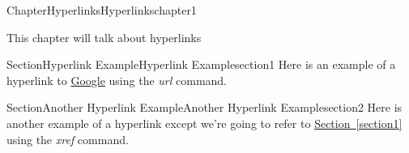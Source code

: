 \documentclass[oneside,10pt,]{book}
\newcommand{\xreffont}{\relax}
\begin{document}
\raggedbottom
%
%
\typeout{************************************************}
\typeout{************************************************}
%
\begin{chapterptx}{Chapter}{Hyperlinks}{}{Hyperlinks}{}{}{chapter1}
\renewcommand*{\chaptername}{Chapter}
\begin{introduction}{}%
This chapter will talk about hyperlinks%
\end{introduction}%
%
%
\typeout{************************************************}
\typeout{************************************************}
%
\begin{sectionptx}{Section}{Hyperlink Example}{}{Hyperlink Example}{}{}{section1}
Here is an example of a hyperlink to \href{https://www.google.com}{Google} using the \emph{url} command.%
\end{sectionptx}
%
%
\typeout{************************************************}
\typeout{************************************************}
%
\begin{sectionptx}{Section}{Another Hyperlink Example}{}{Another Hyperlink Example}{}{}{section2}
Here is another example of a hyperlink except we're going to refer to \hyperref[section1]{Section~{\xreffont\ref{section1}}} using the \emph{xref} command.%
\end{sectionptx}
\end{chapterptx}
\end{document}
